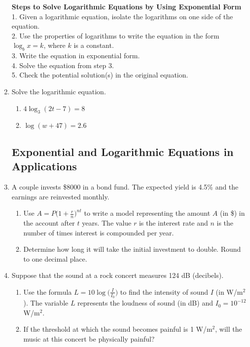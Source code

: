 \begin{enumerate}
\newpage

\noindent \textbf{Steps to Solve Logarithmic Equations by Using Exponential Form}\\
1. Given a logarithmic equation, isolate the logarithms on one side of the equation.\\
2. Use the properties of logarithms to write the equation in the form $\log_b x=k$, where $k$ is a  constant.\\
3. Write the equation in exponential form.\\
4. Solve the equation from step 3.\\
5. Check the potential solution(s) in the original equation.\\



\item Solve the logarithmic equation.
\begin{enumerate}
\item $4\log_3 (2t-7)=8$\vfill
\item $\log(w+47)=2.6$\vfill
\end{enumerate}


\newpage

\subsection{Exponential and Logarithmic Equations in Applications} 


\item A couple invests \$8000 in a bond fund. The expected yield is 4.5\% and the earnings are reinvested monthly.
\begin{enumerate}
\item Use $\displaystyle A=P \Bigg(1+\frac{r}{n}\Bigg)^{nt}$ to write a model representing the amount $A$ (in \$) in the account after $t$ years.  The value $r$ is the interest rate and $n$ is the number of times interest is compounded per year.\\[1in]
\item Determine how long it will take the initial investment to double.  Round to one decimal place.\vfill
\end{enumerate}
\newpage

\item Suppose that the sound at a rock concert measures 124 dB (decibels).
\begin{enumerate}
\item Use the formula $\displaystyle L=10\log \Bigg(\frac{I}{I_0} \Bigg)$ to find the intensity of sound $I$ (in W/m$^2$).  The variable $L$ represents the loudness of sound (in dB) and $I_0=10^{-12}$W/m$^2$.\vfill
\item If the threshold at which the sound becomes painful is 1 W/m$^2$, will the music at this concert be physically painful? \\[1.5in]
\end{enumerate}
\end{enumerate}

